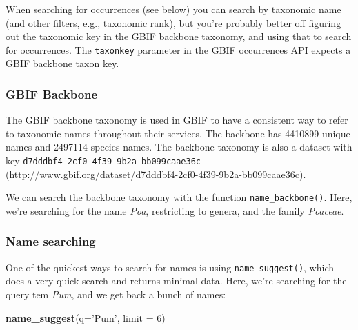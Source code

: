 \documentclass[author-year, review, 11pt]{components/elsarticle} %
\newenvironment{Shaded}{\begin{snugshade}}{\end{snugshade}}
\newcommand{\KeywordTok}[1]{\textcolor[rgb]{0.13,0.29,0.53}{\textbf{{#1}}}}
\newcommand{\DataTypeTok}[1]{\textcolor[rgb]{0.13,0.29,0.53}{{#1}}}
\newcommand{\DecValTok}[1]{\textcolor[rgb]{0.00,0.00,0.81}{{#1}}}
\newcommand{\StringTok}[1]{\textcolor[rgb]{0.31,0.60,0.02}{{#1}}}
\newcommand{\CommentTok}[1]{\textcolor[rgb]{0.56,0.35,0.01}{\textit{{#1}}}}
\newcommand{\NormalTok}[1]{{#1}}
\begin{document}
When searching for occurrences (see below) you can search by taxonomic
name (and other filters, e.g., taxonomic rank), but you're probably
better off figuring out the taxonomic key in the GBIF backbone taxonomy,
and using that to search for occurrences. The \texttt{taxonkey}
parameter in the GBIF occurrences API expects a GBIF backbone taxon key.

\subsubsection{GBIF Backbone}\label{gbif-backbone}

The GBIF backbone taxonomy is used in GBIF to have a consistent way to
refer to taxonomic names throughout their services. The backbone has
4410899 unique names and 2497114 species names. The backbone taxonomy is
also a dataset with key \texttt{d7dddbf4-2cf0-4f39-9b2a-bb099caae36c}
(\url{http://www.gbif.org/dataset/d7dddbf4-2cf0-4f39-9b2a-bb099caae36c}).

We can search the backbone taxonomy with the function
\texttt{name\_backbone()}. Here, we're searching for the name
\emph{Poa}, restricting to genera, and the family \emph{Poaceae}.

\begin{Shaded}
\end{Shaded}

\subsubsection{Name searching}\label{name-searching}

One of the quickest ways to search for names is using
\texttt{name\_suggest()}, which does a very quick search and returns
minimal data. Here, we're searching for the query tem \emph{Pum}, and we
get back a bunch of names:

\begin{Shaded}
\begin{Highlighting}[]
\KeywordTok{name_suggest}\NormalTok{(}\DataTypeTok{q=}\StringTok{'Pum'}\NormalTok{, }\DataTypeTok{limit =} \DecValTok{6}\NormalTok{)}
\end{Highlighting}
\end{Shaded}
\end{document}

